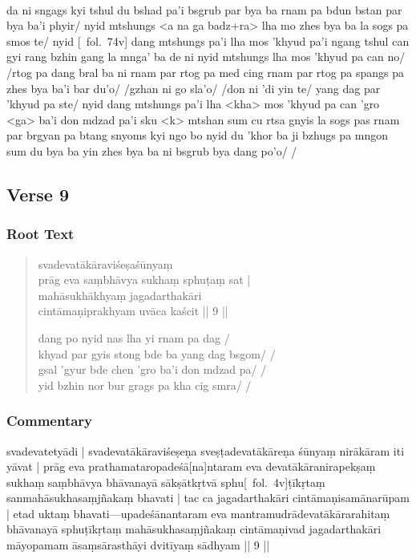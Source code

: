 \documentclass[12pt]{article}
\newcommand{\emdash} {\hspace{0em}—\hspace{0em}}
\begin{document}
\textbf{\TVB}\\
da ni sngags kyi tshul du bshad pa'i bsgrub par bya ba rnam pa bdun bstan par bya ba'i phyir/ nyid mtshungs <a na ga badz+ra> lha mo zhes bya ba la sogs pa smos te/ nyid [\TVB\ fol.\ 74v] dang mtshungs pa'i lha mos 'khyud pa'i ngang tshul can gyi rang bzhin gang la mnga' ba de ni nyid mtshungs lha mos 'khyud pa can no/ /rtog pa dang bral ba ni rnam par rtog pa med cing rnam par rtog pa spangs pa zhes bya ba'i bar du'o/ /gzhan ni go sla'o/ /don ni 'di yin te/ yang dag par 'khyud pa ste/ nyid dang mtshungs pa'i lha <kha> mos 'khyud pa can 'gro <ga> ba'i don mdzad pa'i sku <k> mtshan sum cu rtsa gnyis la sogs pas rnam par brgyan pa btang snyoms kyi ngo bo nyid du 'khor ba ji bzhugs pa mngon sum du bya ba yin zhes bya ba ni bsgrub bya dang po'o/ /

\subsection{Verse 9}
\subsubsection{Root Text}
\begin{quote}
	svadevatākāraviśeṣaśūnyaṃ \\
	prāg eva saṃbhāvya sukhaṃ sphuṭaṃ sat |\\
	mahāsukhākhyaṃ jagadarthakāri \\
	cintāmaṇiprakhyam uvāca kaścit || 9 ||

	dang po nyid nas lha yi rnam pa dag /\\
	khyad par gyis stong bde ba yang dag bsgom/ /\\
	gsal 'gyur bde chen 'gro ba'i don mdzad pa/ /\\
	yid bzhin nor bur grags pa kha cig smra/ /
\end{quote}

\subsubsection{Commentary}
svadevatetyādi | svadevatākāraviśeṣeṇa sveṣṭadevatākāreṇa śūnyaṃ nirākāram iti yāvat | prāg eva prathamataropadeśā[na]ntaram eva devatākāranirapekṣaṃ sukhaṃ saṃbhāvya bhāvanayā sākṣātkṛtvā sphu[\MS\ fol.\ 4v]ṭīkṛtaṃ sanmahāsukhasaṃjñakaṃ bhavati | tac ca jagadarthakāri cintāmaṇisamānarūpam | etad uktaṃ bhavati\emdash upadeśānantaram eva mantramudrādevatākārarahitaṃ bhāvanayā sphuṭīkṛtaṃ mahāsukhasaṃjñakaṃ cintāmaṇivad jagadarthakāri māyopamam āsaṃsārasthāyi dvitīyaṃ sādhyam || 9 ||\\
\end{document}
